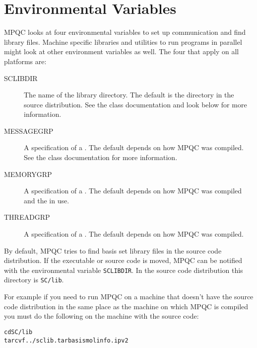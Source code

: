 \section{Environmental Variables}

MPQC looks at four environmental variables to set up
communication and find library files.  Machine specific libraries
and utilities to run programs in parallel might look
at other environment variables as well.  The four that
apply on all platforms are:

\begin{description}
\item[{\ttfamily SCLIBDIR}] The name of the library directory.  The default
                      is the directory in the source distribution.  See the
                       class documentation and
                      look below for more information.
\item[{\ttfamily MESSAGEGRP}] A  specification of a
                       .
                      The default depends on how MPQC was compiled.  See
                      the  class documentation for
                      more information.
\item[{\ttfamily MEMORYGRP}] A  specification of a
                       .
                      The default depends on how MPQC was compiled and the
                       in use.
\item[{\ttfamily THREADGRP}] A  specification of a
                       .
                      The default depends on how MPQC was compiled.
\end{description}

By default, MPQC tries to find basis set library files in
the source code distribution.  If the executable or source
code is moved, MPQC can be notified with the environmental
variable \verb|SCLIBDIR|.  In the source code distribution
this directory is \verb|SC/lib|.

For example if you need to run MPQC on a machine that doesn't
have the source code distribution in the same place as the
machine on which MPQC is compiled you must do the following
on the machine with the source code:

\begin{alltt}
cd SC/lib
tar cvf ../sclib.tar basis molinfo.ipv2
\end{alltt}

